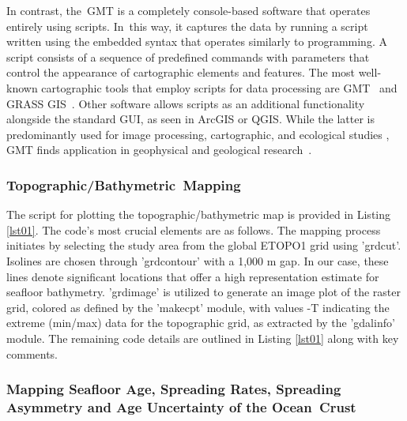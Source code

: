 \documentclass[geomatics,article,accept,pdftex,moreauthors]{Definitions/mdpi}
\begin{document}
In contrast, the~GMT is a completely console-based software that operates entirely using scripts. In~this way, it captures the data by running a script written using the embedded syntax that operates similarly to programming. A script consists of a sequence of predefined commands with parameters that control the appearance of cartographic elements and features. The most well-known cartographic tools that employ scripts for data processing are GMT~\cite{Lemenkova202217} and GRASS GIS~\cite{NETELER2012124}. Other software allows scripts as an additional functionality alongside the standard GUI, as seen in ArcGIS or QGIS. While the latter is predominantly used for image processing, cartographic, and ecological studies \cite{ROCCHINI2017166,FRIGERI20111265,Lemenkova202313,SOROKINE2007685}, GMT finds application in geophysical and geological research~\cite{Lee,Lemenkova202206,DeSanto}. %


\subsubsection{Topographic/Bathymetric~Mapping}

The script for plotting the topographic/bathymetric map is provided in Listing \ref{lst01}. The code's most crucial elements are as follows. The mapping process initiates by selecting the study area from the global ETOPO1 grid using 'grdcut'. Isolines are chosen through 'grdcontour' with a 1,000 m gap. In our case, these lines denote significant locations that offer a high representation estimate for seafloor bathymetry. 'grdimage' is utilized to generate an image plot of the raster grid, colored as defined by the 'makecpt' module, with values -T indicating the extreme (min/max) data for the topographic grid, as extracted by the 'gdalinfo' module. The remaining code details are outlined in Listing \ref{lst01} along with key comments. %

\subsubsection{Mapping Seafloor Age, Spreading Rates, Spreading Asymmetry and Age Uncertainty of the Ocean~Crust}
\end{document}

